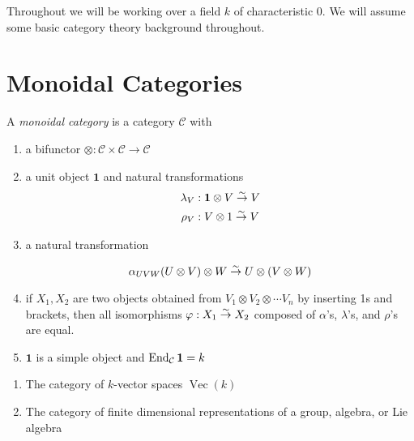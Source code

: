 Throughout we will be working over a field $k$ of characteristic 0. We will
assume some basic category theory background throughout. 

\section{Monoidal Categories}
\begin{defn}
    A \emph{monoidal category} is a category $\mathcal{C}$ with 
    \begin{enumerate}
    \renewcommand{\labelenumi}{\roman{enumi})}
        \item a bifunctor $\otimes: \mathcal{C} \times \mathcal{C} \to
            \mathcal{C}$
        \item a unit object $\mathbf{1}$ and natural transformations
            \begin{align}
                \lambda_V &: \mathbf{1} \otimes V \overset{\sim}{\rightarrow} V \\
                \rho_V &: V \otimes 1 \overset{\sim}{\rightarrow} V
            \end{align}
        \item a natural transformation 

            \begin{equation}
                \alpha_{UVW} (U \otimes V) \otimes W \overset{\sim}{\rightarrow} U \otimes (V \otimes W)
            \end{equation}

        \item if $X_1, X_2$ are two objects obtained from $V_1 \otimes V_2
            \otimes \cdots V_n$ by inserting 1s and brackets, then all
            isomorphisms $\varphi: X_1 \overset{\sim}{\rightarrow} X_2$ composed of $\alpha$'s,
            $\lambda$'s, and $\rho$'s are equal. 
        \item $\mathbf{1}$ is a simple object and $\operatorname{End}_\mathcal{C} \mathbf{1} = k$
    \end{enumerate}

\end{defn}

\begin{example}
    \begin{enumerate}
    \renewcommand{\labelenumi}{\roman{enumi})}
        \item The category of $k$-vector spaces $\operatorname{Vec}(k)$
        \item The category of finite dimensional representations of a group, algebra, or Lie algebra
    \end{enumerate}
\end{example}

